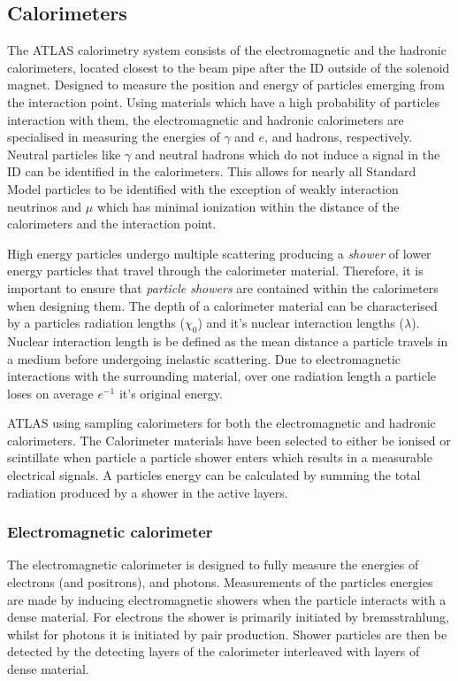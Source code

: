 \subsection{Calorimeters}\label{sec:method:Cals}
The ATLAS calorimetry system consists of the electromagnetic and the hadronic calorimeters, located closest to the beam pipe after the ID outside of the solenoid magnet. Designed to measure the position and energy of particles emerging from the interaction point. Using materials which have a high probability of particles interaction with them, the electromagnetic and hadronic calorimeters are specialised in measuring the energies of $\gamma$ and $e$, and hadrons, respectively. Neutral particles like $\gamma$ and neutral hadrons which do not induce a signal in the ID can be identified in the calorimeters. This allows for nearly all Standard Model particles to be identified with the exception of weakly interaction neutrinos and $\mu$ which has minimal ionization within the distance of the calorimeters and the interaction point. 

High energy particles undergo multiple scattering producing a \emph{shower} of lower energy particles that travel through the calorimeter material. Therefore, it is important to ensure that  \emph{particle showers} are contained within the calorimeters when designing them. The depth of a calorimeter material can be characterised by a particles radiation lengths ($\chi_{0}$) and it's nuclear interaction lengths ($\lambda$). Nuclear interaction length is be defined as the mean distance a particle travels in a medium before undergoing inelastic scattering. Due to electromagnetic interactions with the surrounding material, over one radiation length a particle loses on average $e^{-1}$ it's original energy. 

ATLAS using sampling calorimeters for both the electromagnetic and hadronic calorimeters. The Calorimeter materials have been selected to either be ionised or scintillate when particle a particle shower enters which results in a measurable electrical signals. A particles energy can be calculated by summing the total radiation produced by a shower in the active layers. 

\subsubsection{Electromagnetic calorimeter}
The electromagnetic calorimeter is designed to fully measure the energies of electrons (and positrons), and photons. Measurements of the particles energies are made by inducing electromagnetic showers when the particle interacts with a dense material. For electrons the shower is primarily initiated by bremsstrahlung, whilst for photons it is initiated by pair production. Shower particles are then be detected by the detecting layers of the calorimeter interleaved with layers of dense material.

